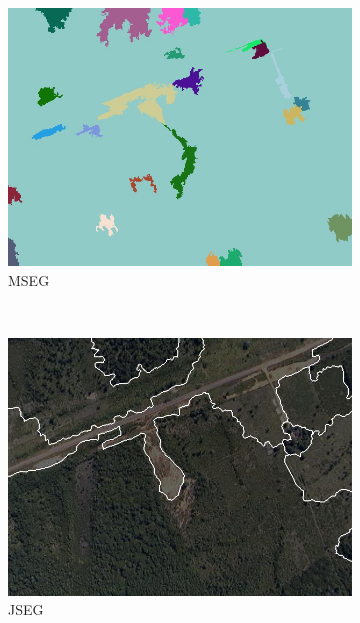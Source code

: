 \begin{figure}[htb]
\begin{minipage}[r]{0.48\linewidth}
\begin{subfigure}{.47\linewidth}
			\includegraphics[width=\linewidth]{imgs/seg_mseg}
			\caption{MSEG}
		\end{subfigure}%
		\\
		\begin{subfigure}{.47\linewidth}
			\includegraphics[width=\linewidth]{imgs/seg_jseg}
			\caption{JSEG}
		\end{subfigure}
		\begin{subfigure}{.47\linewidth}

\end{subfigure}
\end{minipage}
\end{figure}
